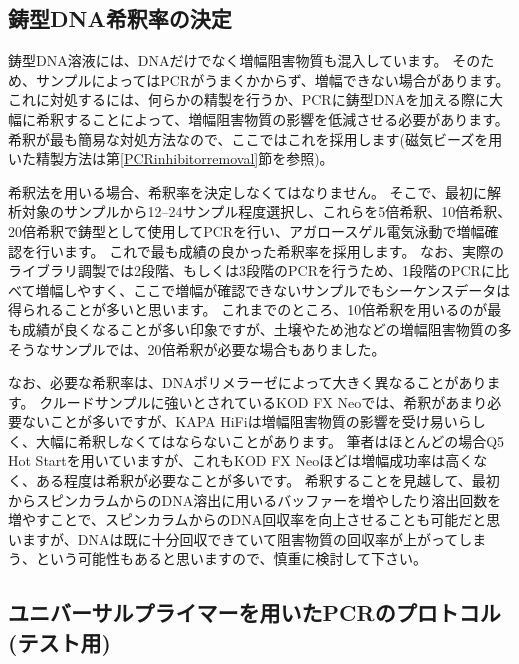 \documentclass[titlepage,10pt,a4paper,uplatex]{jsbook}
\begin{document}
\subsection{鋳型DNA希釈率の決定}

鋳型DNA溶液には、DNAだけでなく増幅阻害物質も混入しています。
そのため、サンプルによってはPCRがうまくかからず、増幅できない場合があります。
これに対処するには、何らかの精製を行うか、PCRに鋳型DNAを加える際に大幅に希釈することによって、増幅阻害物質の影響を低減させる必要があります。
希釈が最も簡易な対処方法なので、ここではこれを採用します(磁気ビーズを用いた精製方法は第\ref{PCRinhibitorremoval}節を参照)。

希釈法を用いる場合、希釈率を決定しなくてはなりません。
そこで、最初に解析対象のサンプルから12--24サンプル程度選択し、これらを5倍希釈、10倍希釈、20倍希釈で鋳型として使用してPCRを行い、アガロースゲル電気泳動で増幅確認を行います。
これで最も成績の良かった希釈率を採用します。
なお、実際のライブラリ調製では2段階、もしくは3段階のPCRを行うため、1段階のPCRに比べて増幅しやすく、ここで増幅が確認できないサンプルでもシーケンスデータは得られることが多いと思います。
これまでのところ、10倍希釈を用いるのが最も成績が良くなることが多い印象ですが、土壌やため池などの増幅阻害物質の多そうなサンプルでは、20倍希釈が必要な場合もありました。

なお、必要な希釈率は、DNAポリメラーゼによって大きく異なることがあります。
クルードサンプルに強いとされているKOD FX Neoでは、希釈があまり必要ないことが多いですが、KAPA HiFiは増幅阻害物質の影響を受け易いらしく、大幅に希釈しなくてはならないことがあります。
筆者はほとんどの場合Q5 Hot Startを用いていますが、これもKOD FX Neoほどは増幅成功率は高くなく、ある程度は希釈が必要なことが多いです。
希釈することを見越して、最初からスピンカラムからのDNA溶出に用いるバッファーを増やしたり溶出回数を増やすことで、スピンカラムからのDNA回収率を向上させることも可能だと思いますが、DNAは既に十分回収できていて阻害物質の回収率が上がってしまう、という可能性もあると思いますので、慎重に検討して下さい。

\subsection{ユニバーサルプライマーを用いたPCRのプロトコル (テスト用)}
\end{document}
